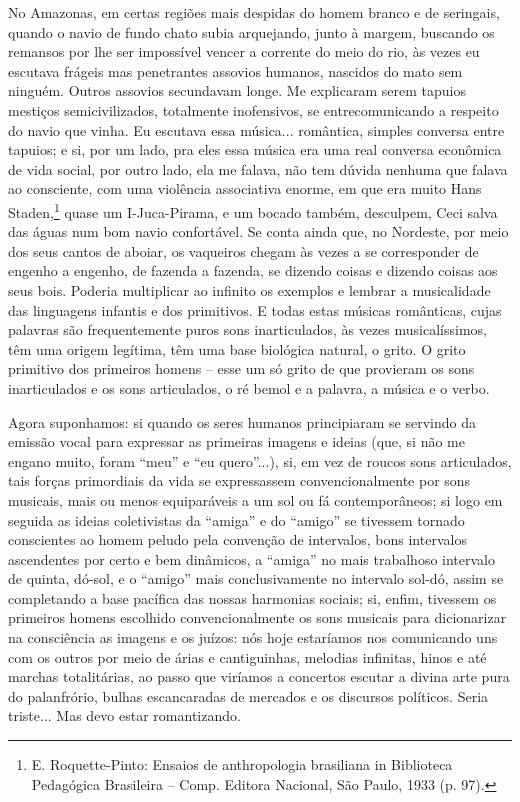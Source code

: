 No Amazonas, em certas regiões mais despidas do homem branco e de
seringais, quando o navio de fundo chato subia arquejando, junto à
margem, buscando os remansos por lhe ser impossível vencer a corrente do
meio do rio, às vezes eu escutava frágeis mas penetrantes assovios
humanos, nascidos do mato sem ninguém. Outros assovios secundavam longe.
Me explicaram serem tapuios mestiços semicivilizados, totalmente
inofensivos, se entrecomunicando a respeito do navio que vinha. Eu
escutava essa música... romântica, simples conversa entre tapuios; e si,
por um lado, pra eles essa música era uma real conversa econômica de
vida social, por outro lado, ela me falava, não tem dúvida nenhuma que
falava ao consciente, com uma violência associativa enorme, em que era
muito Hans Staden,\footnote{E. Roquette-Pinto: Ensaios de anthropologia brasiliana in Biblioteca Pedagógica Brasileira -- Comp. Editora Nacional, São Paulo, 1933 (p.
97).} quase um I-Juca-Pirama, e um bocado também,
desculpem, Ceci salva das águas num bom navio confortável. Se conta
ainda que, no Nordeste, por meio dos seus cantos de aboiar, os vaqueiros
chegam às vezes a se corresponder de engenho a engenho, de fazenda a
fazenda, se dizendo coisas e dizendo coisas aos seus bois. Poderia
multiplicar ao infinito os exemplos e lembrar a musicalidade das
linguagens infantis e dos primitivos. E todas estas músicas românticas,
cujas palavras são frequentemente puros sons inarticulados, às vezes
musicalíssimos, têm uma origem legítima, têm uma base biológica natural,
o grito. O grito primitivo dos primeiros homens -- esse um só grito de
que provieram os sons inarticulados e os sons articulados, o ré bemol e
a palavra, a música e o verbo.

Agora suponhamos: si quando os seres humanos principiaram se servindo da
emissão vocal para expressar as primeiras imagens e ideias (que, si não
me engano muito, foram ``meu'' e ``eu quero''...), si, em vez de roucos
sons articulados, tais forças primordiais da vida se expressassem
convencionalmente por sons musicais, mais ou menos equiparáveis a um sol
ou fá contemporâneos; si logo em seguida as ideias coletivistas da
``amiga'' e do ``amigo'' se tivessem tornado conscientes ao homem peludo
pela convenção de intervalos, bons intervalos ascendentes por certo e
bem dinâmicos, a ``amiga'' no mais trabalhoso intervalo de quinta,
dó-sol, e o ``amigo'' mais conclusivamente no intervalo sol-dó, assim se
completando a base pacífica das nossas harmonias sociais; si, enfim,
tivessem os primeiros homens escolhido convencionalmente os sons
musicais para dicionarizar na consciência as imagens e os juízos: nós
hoje estaríamos nos comunicando uns com os outros por meio de árias e
cantiguinhas, melodias infinitas, hinos e até marchas totalitárias, ao
passo que viríamos a concertos escutar a divina arte pura do
palanfrório, bulhas escancaradas de mercados e os discursos políticos.
Seria triste... Mas devo estar romantizando.

